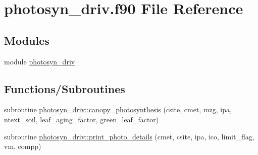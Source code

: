 \hypertarget{photosyn__driv_8f90}{}\section{photosyn\+\_\+driv.\+f90 File Reference}
\label{photosyn__driv_8f90}
\subsection*{Modules}
\begin{DoxyCompactItemize}
\item 
module \hyperlink{namespacephotosyn__driv}{photosyn\+\_\+driv}
\end{DoxyCompactItemize}
\subsection*{Functions/\+Subroutines}
\begin{DoxyCompactItemize}
\item 
subroutine \hyperlink{namespacephotosyn__driv_ab119b4778d2f39f21535685acf3ca050}{photosyn\+\_\+driv\+::canopy\+\_\+photosynthesis} (csite, cmet, mzg, ipa, ntext\+\_\+soil, leaf\+\_\+aging\+\_\+factor, green\+\_\+leaf\+\_\+factor)
\item 
subroutine \hyperlink{namespacephotosyn__driv_a28c7b6f09c6e1da3243062af86d9290e}{photosyn\+\_\+driv\+::print\+\_\+photo\+\_\+details} (cmet, csite, ipa, ico, limit\+\_\+flag, vm, compp)
\end{DoxyCompactItemize}
